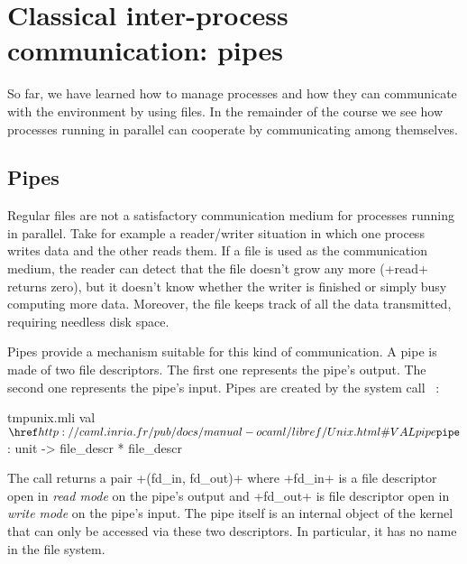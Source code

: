%
%

\chapter{Classical inter-process communication: pipes}

\label{sec/pipes}

So far, we have learned how to manage processes and how they can communicate
with the environment by using files. In the remainder of the
course we see how processes running in parallel can cooperate by
communicating among themselves.

\section{Pipes}

Regular files are not a satisfactory communication medium for processes
running in parallel. Take for example a reader/writer situation in
which one process writes data and the other reads them. If a file is used
as the communication medium, the reader can detect that the file
doesn't grow any more (\ml+read+ returns zero), but it doesn't know
whether the writer is finished or simply busy computing
more data. Moreover, the file keeps track of all the data transmitted,
requiring needless disk space.

Pipes provide a mechanism suitable for this kind of communication. A
pipe is made of two file descriptors. The first one
represents the pipe's output. The second one represents
the pipe's input. Pipes are created by the system call
~:
%
\begin{listingcodefile}{tmpunix.mli}
val $\libvalue{Unix}{pipe}$ : unit -> file_descr * file_descr
\end{listingcodefile}
%
The call returns a pair \ml+(fd_in, fd_out)+ where \ml+fd_in+ is a
file descriptor open in \emph{read mode} on the pipe's output and
\ml+fd_out+ is file descriptor open in \emph{write mode} on the pipe's
input. The pipe itself is an internal object of the kernel that can
only be accessed via these two descriptors. In particular, it has no
name in the file system.

